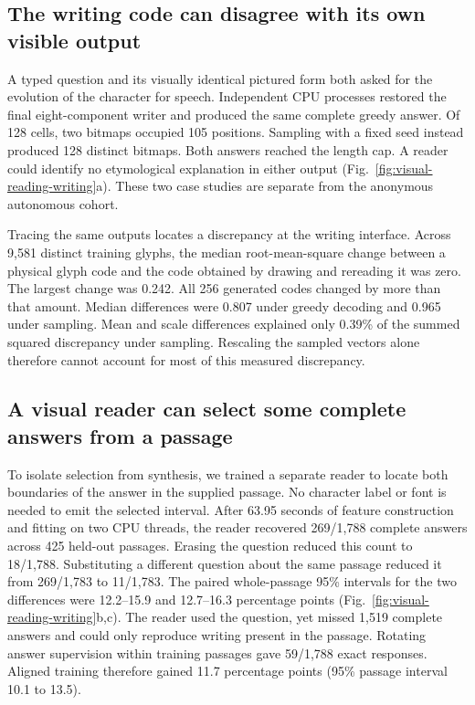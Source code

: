 \documentclass[12pt,a4paper]{article}
\providecommand{\DIFadd}[1]{{\protect\color{blue} \sf #1}} %
\begin{document}
\subsection*{\DIFadd{The writing code can disagree with its own visible output}}
\DIFadd{A typed question and its visually identical pictured form both asked for
the evolution of the character for speech. Independent CPU processes restored
the final eight-component writer and produced the same complete greedy answer.
Of 128 cells, two bitmaps occupied 105 positions. Sampling with a fixed seed
instead produced 128 distinct bitmaps. Both answers reached the length cap.
A reader could identify no etymological explanation in either output
(Fig.~\ref{fig:visual-reading-writing}a). These two case studies are separate
from the anonymous autonomous cohort.
}

\DIFadd{Tracing the same outputs locates a discrepancy at the writing interface.
Across 9,581 distinct training glyphs, the median root-mean-square change
between a physical glyph code and the code obtained by drawing and rereading
it was zero. The largest change was 0.242. All 256 generated codes changed by
more than that amount. Median differences were 0.807 under greedy decoding and
0.965 under sampling. Mean and scale differences explained only 0.39\% of
the summed squared discrepancy under sampling. Rescaling the sampled vectors
alone therefore cannot account for most of this measured discrepancy.
}

\subsection*{\DIFadd{A visual reader can select some complete answers from a passage}}
\DIFadd{To isolate selection from synthesis, we trained a separate reader to locate
both boundaries of the answer in the supplied passage. No character label or
font is needed to emit the selected interval. After 63.95 seconds of feature
construction and fitting on two CPU threads, the reader recovered 269/1,788
complete answers across 425 held-out passages. Erasing the question reduced
this count to 18/1,788. Substituting a different question about the same
passage reduced it from 269/1,783 to 11/1,783. The paired whole-passage
95\% intervals for the two differences were 12.2--15.9 and 12.7--16.3
percentage points (Fig.~\ref{fig:visual-reading-writing}b,c).
The reader used the question, yet missed 1,519 complete answers and could
only reproduce writing present in the passage. Rotating answer supervision within
training passages gave 59/1,788 exact responses. Aligned training therefore
gained 11.7 percentage points (95\% passage interval 10.1 to 13.5).
}
\end{document}
